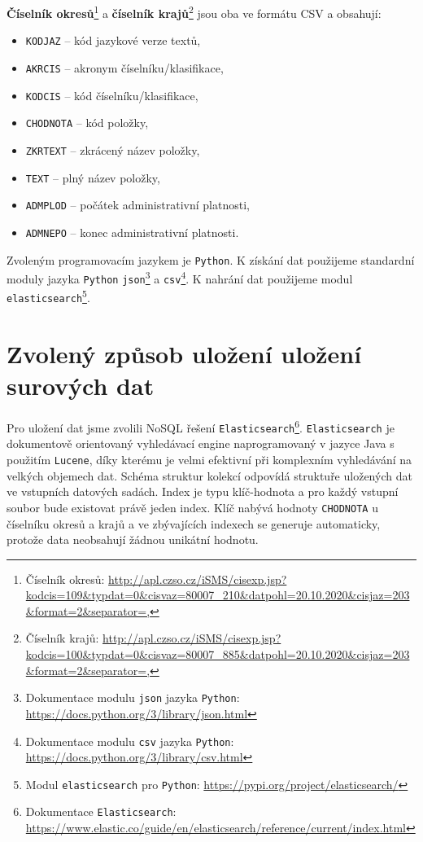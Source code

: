 \documentclass[11pt,a4paper,titlepage]{article}
\begin{document}
\textbf{Číselník okresů}\footnote{Číselník okresů: \url{http://apl.czso.cz/iSMS/cisexp.jsp?kodcis=109&typdat=0&cisvaz=80007_210&datpohl=20.10.2020&cisjaz=203&format=2&separator=,}} a \textbf{číselník krajů}\footnote{Číselník krajů: \url{http://apl.czso.cz/iSMS/cisexp.jsp?kodcis=100&typdat=0&cisvaz=80007_885&datpohl=20.10.2020&cisjaz=203&format=2&separator=,}} jsou oba ve formátu CSV a obsahují:
\begin{itemize}
    \setlength\itemsep{0.3em}
    \item \texttt{KODJAZ} -- kód jazykové verze textů,
    \item \texttt{AKRCIS} -- akronym číselníku/klasifikace,
    \item \texttt{KODCIS} -- kód číselníku/klasifikace,
    \item \texttt{CHODNOTA} -- kód položky,
    \item \texttt{ZKRTEXT} -- zkrácený název položky,
    \item \texttt{TEXT} -- plný název položky,
    \item \texttt{ADMPLOD} -- počátek administrativní platnosti,
    \item \texttt{ADMNEPO} -- konec administrativní platnosti.
\end{itemize}

Zvoleným programovacím jazykem je \texttt{Python}\cite{python}. K získání dat použijeme standardní moduly jazyka \texttt{Python}\cite{python} 
\texttt{json}\footnote{Dokumentace modulu \texttt{json} jazyka \texttt{Python}\cite{python}: \url{https://docs.python.org/3/library/json.html}} a
\texttt{csv}\footnote{Dokumentace modulu \texttt{csv} jazyka \texttt{Python}\cite{python}: \url{https://docs.python.org/3/library/csv.html}}. K nahrání dat použijeme modul \texttt{elasticsearch}\footnote{Modul \texttt{elasticsearch} pro \texttt{Python}: \url{https://pypi.org/project/elasticsearch/}}.

\section{Zvolený způsob uložení uložení surových dat}

Pro uložení dat jsme zvolili NoSQL řešení \texttt{Elasticsearch}\cite{elastic}\footnote{Dokumentace \texttt{Elasticsearch}\cite{elastic}: \url{https://www.elastic.co/guide/en/elasticsearch/reference/current/index.html}}. \texttt{Elasticsearch} je dokumentově orientovaný vyhledávací engine naprogramovaný v jazyce Java s použitím \texttt{Lucene}\cite{lucene}, díky kterému je velmi efektivní při komplexním vyhledávání na velkých objemech dat. Schéma struktur kolekcí odpovídá struktuře uložených dat ve vstupních datových sadách. Index je typu klíč-hodnota a pro každý vstupní soubor bude existovat právě jeden index. Klíč nabývá hodnoty \texttt{CHODNOTA} u číselníku okresů a krajů a ve zbývajících indexech se generuje automaticky, protože data neobsahují žádnou unikátní hodnotu.



\end{document}
